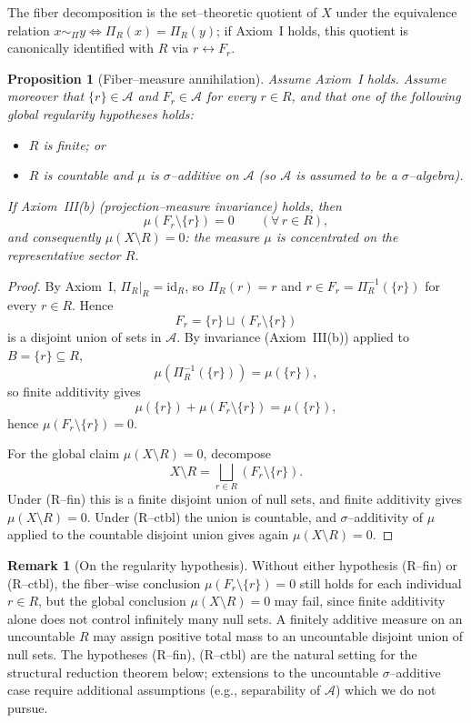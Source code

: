 \documentclass[11pt]{article}
\numberwithin{equation}{section}
\newtheorem{proposition}[theorem]{Proposition}
\theoremstyle{definition}
\newtheorem{remark}[theorem]{Remark}
\begin{document}
The fiber decomposition is the set--theoretic quotient of $X$ under the equivalence relation $x\sim_\Pi y\iff\Pi_R(x)=\Pi_R(y)$; if Axiom~I holds, this quotient is canonically identified with $R$ via $r\leftrightarrow F_r$.

\begin{proposition}[Fiber--measure annihilation]\label{prop:fiber-annihilation}
Assume Axiom~I holds. Assume moreover that $\{r\}\in\mathcal A$ and $F_r\in\mathcal A$ for every $r\in R$, and that one of the following global regularity hypotheses holds:
\begin{itemize}[nosep]
\item[\emph{(R--fin)}] $R$ is finite; or
\item[\emph{(R--ctbl)}] $R$ is countable and $\mu$ is $\sigma$--additive on $\mathcal A$ (so $\mathcal A$ is assumed to be a $\sigma$--algebra).
\end{itemize}
If Axiom~III(b) (projection--measure invariance) holds, then
\[
\mu(F_r\setminus\{r\})=0\qquad(\forall\,r\in R),
\]
and consequently $\mu(X\setminus R)=0$: the measure $\mu$ is concentrated on the representative sector $R$.
\end{proposition}

\begin{proof}
By Axiom~I, $\Pi_R|_R=\mathrm{id}_R$, so $\Pi_R(r)=r$ and $r\in F_r=\Pi_R^{-1}(\{r\})$ for every $r\in R$. Hence
\[
F_r=\{r\}\sqcup(F_r\setminus\{r\})
\]
is a disjoint union of sets in $\mathcal A$. By invariance (Axiom~III(b)) applied to $B=\{r\}\subseteq R$,
\[
\mu(\Pi_R^{-1}(\{r\}))=\mu(\{r\}),
\]
so finite additivity gives
\[
\mu(\{r\})+\mu(F_r\setminus\{r\})=\mu(\{r\}),
\]
hence $\mu(F_r\setminus\{r\})=0$.

For the global claim $\mu(X\setminus R)=0$, decompose
\[
X\setminus R=\bigsqcup_{r\in R}(F_r\setminus\{r\}).
\]
Under (R--fin) this is a finite disjoint union of null sets, and finite additivity gives $\mu(X\setminus R)=0$. Under (R--ctbl) the union is countable, and $\sigma$--additivity of $\mu$ applied to the countable disjoint union gives again $\mu(X\setminus R)=0$.
\end{proof}

\begin{remark}[On the regularity hypothesis]\label{rem:regularity-hypothesis}
Without either hypothesis (R--fin) or (R--ctbl), the fiber--wise conclusion $\mu(F_r\setminus\{r\})=0$ still holds for each individual $r\in R$, but the global conclusion $\mu(X\setminus R)=0$ may fail, since finite additivity alone does not control infinitely many null sets. A finitely additive measure on an uncountable $R$ may assign positive total mass to an uncountable disjoint union of null sets. The hypotheses (R--fin), (R--ctbl) are the natural setting for the structural reduction theorem below; extensions to the uncountable $\sigma$--additive case require additional assumptions (e.g., separability of $\mathcal A$) which we do not pursue.
\end{remark}
\end{document}
